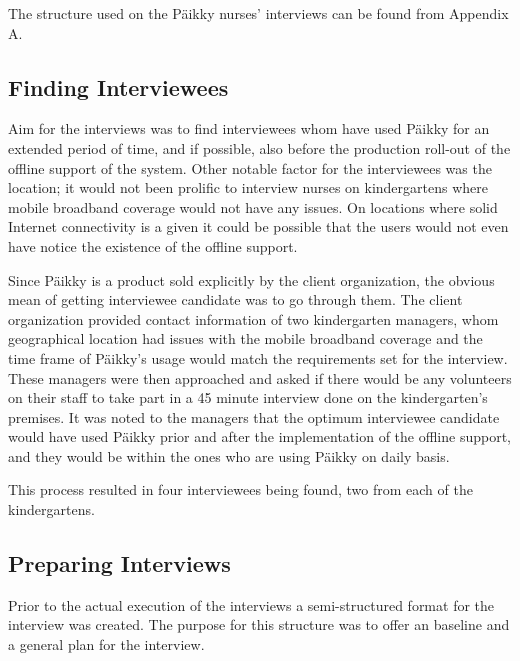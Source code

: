 The structure used on the Päikky nurses' interviews can be found from Appendix A. %



\subsection{Finding Interviewees}

Aim for the interviews was to find interviewees whom have used Päikky for an extended period of time, and if possible, also before the production roll-out of the offline support of the system. Other notable factor for the interviewees was the location; it would not been prolific to interview nurses on kindergartens where mobile broadband coverage would not have any issues. On locations where solid Internet connectivity is a given it could be possible that the users would not even have notice the existence of the offline support.

Since Päikky is a product sold explicitly by the client organization, the obvious mean of getting interviewee candidate was to go through them. The client organization provided contact information of two kindergarten managers, whom geographical location had issues with the mobile broadband coverage and the time frame of Päikky's usage would match the requirements set for the interview. These managers were then approached and asked if there would be any volunteers on their staff to take part in a 45 minute interview done on the kindergarten's premises. It was noted to the managers that the optimum interviewee candidate would have used Päikky prior and after the implementation of the offline support, and they would be within the ones who are using Päikky on daily basis.

This process resulted in four interviewees being found, two from each of the kindergartens. 




\subsection{Preparing Interviews}
Prior to the actual execution of the interviews a semi-structured format for the interview was created. The purpose for this structure was to offer an baseline and a general plan for the interview. 

